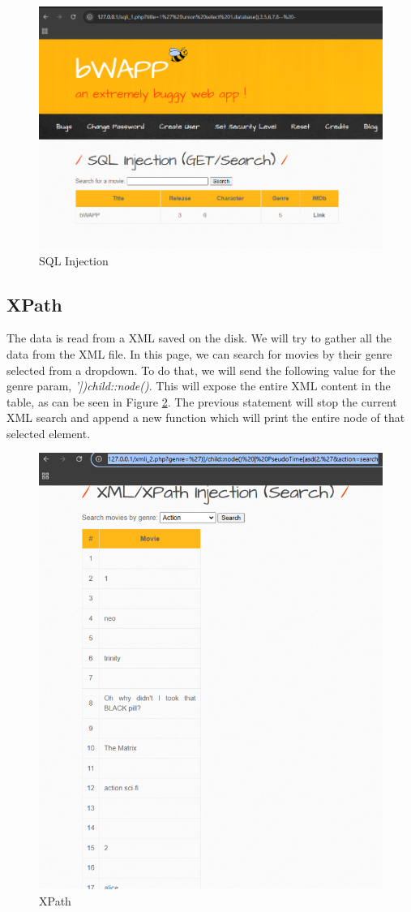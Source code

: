 \documentclass{article}
\begin{document}
\begin{figure}[H]
    \centering
    \includegraphics[width=0.5\linewidth]{Figures/defensive/sql-injection.PNG}
    \caption{SQL Injection}
    \label{fig:defensive-sql-injection}
\end{figure}

\subsection{XPath}
The data is read from a XML saved on the disk. We will try to gather all the data from the XML file. In this page, we can search for movies by their genre selected from a dropdown. To do that, we will send the following value for the genre param, \textit{'])child::node()}. This will expose the entire XML content in the table, as can be seen in Figure \ref{fig:defensive-xpath}. The previous statement will stop the current XML search and append a new function which will print the entire node of that selected element.
\begin{figure}[H]
    \centering
    \includegraphics[width=0.5\linewidth]{Figures/defensive/xpath.PNG}
    \caption{XPath}
    \label{fig:defensive-xpath}
\end{figure}
\end{document}
